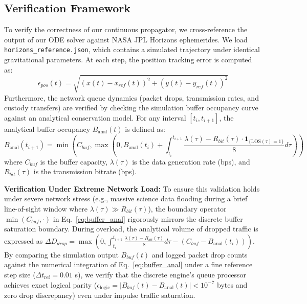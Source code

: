 \documentclass[a4paper,fleqn]{cas-sc}
\begin{document}
\subsection{Verification Framework}
To verify the correctness of our continuous propagator, we cross-reference the output of our ODE solver against NASA JPL Horizons ephemerides. We load \texttt{horizons\_reference.json}, which contains a simulated trajectory under identical gravitational parameters. At each step, the position tracking error is computed as:
\begin{equation}
    \epsilon_{pos}(t) = \sqrt{(x(t) - x_{ref}(t))^2 + (y(t) - y_{ref}(t))^2}
    \label{eq:pos_err}
\end{equation}
Furthermore, the network queue dynamics (packet drops, transmission rates, and custody transfers) are verified by checking the simulation buffer occupancy curve against an analytical conservation model. For any interval $[t_i, t_{i+1}]$, the analytical buffer occupancy $B_{\text{anal}}(t)$ is defined as:
\begin{equation}
    B_{\text{anal}}(t_{i+1}) = \min \left( C_{buf}, \max\left(0, B_{\text{anal}}(t_i) + \int_{t_i}^{t_{i+1}} \frac{\lambda(\tau) - R_{bit}(\tau) \cdot \mathbf{1}_{\{\text{LOS}(\tau) = 1\}}}{8} d\tau\right) \right)
    \label{eq:buffer_anal}
\end{equation}
where $C_{buf}$ is the buffer capacity, $\lambda(\tau)$ is the data generation rate (bps), and $R_{bit}(\tau)$ is the transmission bitrate (bps). 

\noindent\textbf{Verification Under Extreme Network Load:} To ensure this validation holds under severe network stress (e.g., massive science data flooding during a brief line-of-sight window where $\lambda(\tau) \gg R_{bit}(\tau)$), the boundary operator $\min(C_{buf}, \cdot)$ in Eq.~\eqref{eq:buffer_anal} rigorously mirrors the discrete buffer saturation boundary. During overload, the analytical volume of dropped traffic is expressed as $\Delta D_{drop} = \max\left(0, \int_{t_i}^{t_{i+1}} \frac{\lambda(\tau) - R_{bit}(\tau)}{8} d\tau - (C_{buf} - B_{\text{anal}}(t_i))\right)$. By comparing the simulation output $B_{buf}(t)$ and logged packet drop counts against the numerical integration of Eq.~\eqref{eq:buffer_anal} under a fine reference step size ($\Delta t_{\text{ref}} = 0.01$ s), we verify that the discrete engine's queue processor achieves exact logical parity ($\epsilon_{\text{logic}} = |B_{buf}(t) - B_{\text{anal}}(t)| < 10^{-7}$ bytes and zero drop discrepancy) even under impulse traffic saturation.
\end{document}
